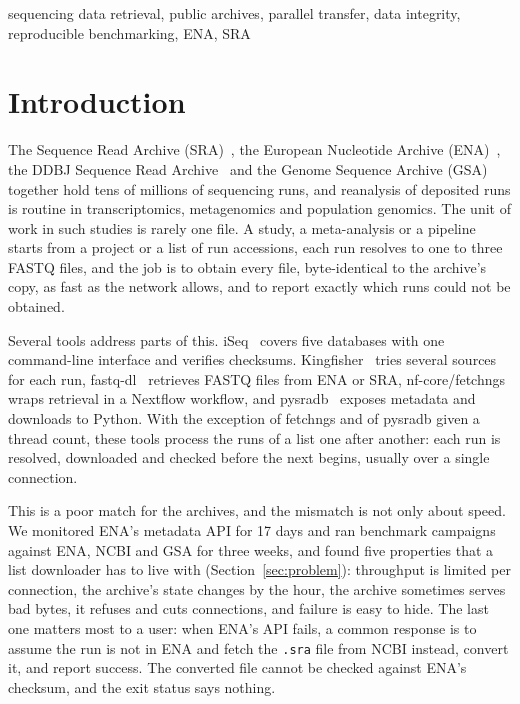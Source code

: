 \documentclass[conference]{IEEEtran}
\begin{document}
\begin{IEEEkeywords}
sequencing data retrieval, public archives, parallel transfer, data integrity, reproducible benchmarking, ENA, SRA
\end{IEEEkeywords}

\section{Introduction}
The Sequence Read Archive (SRA)~\cite{sra}, the European Nucleotide Archive (ENA)~\cite{ena}, the DDBJ Sequence Read Archive~\cite{ddbj} and the Genome Sequence Archive (GSA)~\cite{gsa} together hold tens of millions of sequencing runs, and reanalysis of deposited runs is routine in transcriptomics, metagenomics and population genomics. The unit of work in such studies is rarely one file. A study, a meta-analysis or a pipeline starts from a project or a list of run accessions, each run resolves to one to three FASTQ files, and the job is to obtain every file, byte-identical to the archive's copy, as fast as the network allows, and to report exactly which runs could not be obtained.

Several tools address parts of this. iSeq~\cite{iseq} covers five databases with one command-line interface and verifies checksums. Kingfisher~\cite{kingfisher} tries several sources for each run, fastq-dl~\cite{fastqdl} retrieves FASTQ files from ENA or SRA, nf-core/fetchngs~\cite{fetchngs,nfcore} wraps retrieval in a Nextflow workflow, and pysradb~\cite{pysradb} exposes metadata and downloads to Python. With the exception of fetchngs and of pysradb given a thread count, these tools process the runs of a list one after another: each run is resolved, downloaded and checked before the next begins, usually over a single connection.

This is a poor match for the archives, and the mismatch is not only about speed. We monitored ENA's metadata API for 17 days and ran benchmark campaigns against ENA, NCBI and GSA for three weeks, and found five properties that a list downloader has to live with (Section~\ref{sec:problem}): throughput is limited per connection, the archive's state changes by the hour, the archive sometimes serves bad bytes, it refuses and cuts connections, and failure is easy to hide. The last one matters most to a user: when ENA's API fails, a common response is to assume the run is not in ENA and fetch the \texttt{.sra} file from NCBI instead, convert it, and report success. The converted file cannot be checked against ENA's checksum, and the exit status says nothing.
\end{document}
